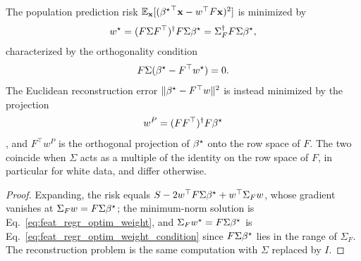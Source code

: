 \begin{lem}
The population prediction risk $\mathbb{E}_{\mathbf{x}}[({{\beta^{\star}}}^\top\mathbf{x}-w^\top F\mathbf{x})^2]$ is
minimized by
\begin{equation}
w^\star=(F\Sigma F^\top)^\dagger F\Sigma{\beta^{\star}}=\Sigma_F^\dagger F\Sigma{\beta^{\star}},
\label{eq:feat_regr_optim_weight}
\end{equation}
characterized by the orthogonality condition
\begin{equation}
F\Sigma({\beta^{\star}}-F^\top w^\star)=0 .
\label{eq:feat_regr_optim_weight_condition}
\end{equation}
The Euclidean reconstruction error $\|{\beta^{\star}}-F^\top w\|^2$ is instead
minimized by the projection 
\begin{equation}w^P=(FF^\top)^\dagger F{\beta^{\star}}\end{equation}, and
$F^\top w^P$ is the orthogonal projection of ${\beta^{\star}}$ onto the row space of
$F$.  The two coincide when $\Sigma$ acts as a multiple of the identity on
the row space of $F$, in particular for white data, and differ otherwise.
\end{lem}
\begin{proof}
Expanding, the risk equals $S-2w^\top F\Sigma{\beta^{\star}}+w^\top \Sigma_F w$, whose
gradient vanishes at $\Sigma_F w=F\Sigma{\beta^{\star}}$; the minimum-norm solution is
Eq.~\ref{eq:feat_regr_optim_weight}, and $\Sigma_F w^\star=F\Sigma{\beta^{\star}}$ is
Eq.~\ref{eq:feat_regr_optim_weight_condition} since $F\Sigma{\beta^{\star}}$ lies in
the range of $\Sigma_F$.  The reconstruction problem is the same computation with
$\Sigma$ replaced by $I$.
\end{proof}

